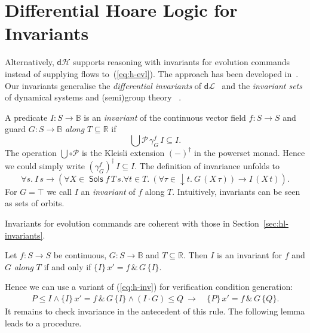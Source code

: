 \documentclass[envcountsame]{llncs}
\newcommand{\dL}{\mathsf{d}\mathcal{L}}
\newcommand{\dH}{\mathsf{d}\mathcal{H}}
\newcommand{\Pow}{\mathcal{P}}
\newcommand{\reals}{\mathbb{R}}
\newcommand{\bools}{\mathbb{B}}
\newcommand{\Sols}{\mathop{\mathsf{Sols}}}
\begin{document}

\section{Differential Hoare Logic for Invariants}\label{sec:hoare-inv}

Alternatively, $\dH$ supports reasoning with invariants for evolution
commands instead of supplying flows to~(\ref{eq:h-evl}).  The approach
has been developed in~\cite{MuniveS19}. Our invariants generalise the
\emph{differential invariants} of $\dL$~\cite{Platzer18} and the
\emph{invariant sets} of dynamical systems and (semi)group
theory~\cite{Teschl12} .

A predicate $I:S\to\bools$ is an \emph{invariant} of the continuous
vector field $f:S\to S$ and guard $G:S\to\bools$ \emph{along}
$T\subseteq \reals$ if
\begin{equation*}
\bigcup \Pow\, \gamma^f_G\, I\subseteq  I.
\end{equation*}
The operation $\bigcup\circ\Pow$ is the Kleisli extension $(-)^\dagger$
in the powerset monad. Hence we could simply write
$(\gamma^f_G)^\dagger\, I \subseteq I$. The definition of invariance
unfolds to
\begin{equation*}
  \forall s.\ I\, s \to (\forall X\in\Sols f\, T\, s.\forall t\in T.\ (\forall \tau\in {\downarrow}t.\ G\, (X\, \tau)) \to I\, (X\, t)).
\end{equation*}
For $G=\top$ we call $I$ an \emph{invariant} of $f$ along $T$.
Intuitively, invariants can be seen as sets of orbits.

Invariants for evolution commands are coherent with those in Section~\ref{sec:hl-invariants}.
\begin{proposition}\label{P:inv-prop}
  Let $f:S\to S$ be continuous, $G:S\to\bools$ and
  $T\subseteq \reals$. Then $I$ is an invariant for $f$ and $G$ \emph{along} $T$ if and only if
$ \{I\}\, x' = f\, \&\, G\, \{I\}$.
\end{proposition}
Hence we can use a variant of (\ref{eq:h-inv}) for verification condition generation:
\begin{align}
  P\le I \land \{I\}\, x' = f\, \&\, G\, \{I\}\land (I\cdot G)\le Q\ \rightarrow\
  &\{P\}\, x' = f\, \&\, G\, \{Q\}.\label{eq:h-invg}\tag{h-invg}
\end{align}
It remains to check invariance in the antecedent of this rule. The
following lemma leads to a procedure.
\end{document}
